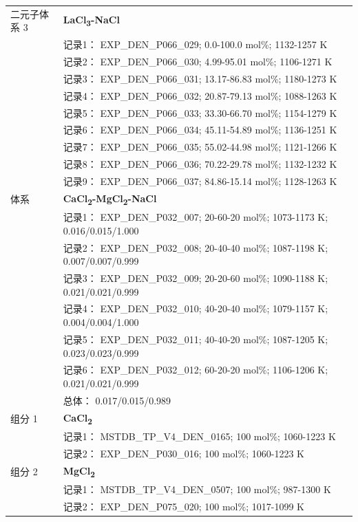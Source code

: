 \documentclass[12pt]{article}
\begin{document}
{\begin{longtable}[]{@{}
  >{\raggedright\arraybackslash}p{}
  >{\raggedright\arraybackslash}p{}@{}}
二元子体系 3  & \textbf{LaCl\textsubscript{3}-NaCl} \\
 & 记录1： EXP\_DEN\_P066\_029; 0.0-100.0 mol\%; 1132-1257 K \\
 & 记录2： EXP\_DEN\_P066\_030; 4.99-95.01 mol\%; 1106-1271 K \\
 & 记录3： EXP\_DEN\_P066\_031; 13.17-86.83 mol\%; 1180-1273 K \\
 & 记录4： EXP\_DEN\_P066\_032; 20.87-79.13 mol\%; 1088-1263 K \\
 & 记录5： EXP\_DEN\_P066\_033; 33.30-66.70 mol\%; 1154-1279 K \\
 & 记录6： EXP\_DEN\_P066\_034; 45.11-54.89 mol\%; 1136-1251 K \\
 & 记录7： EXP\_DEN\_P066\_035; 55.02-44.98 mol\%; 1121-1266 K \\
 & 记录8： EXP\_DEN\_P066\_036; 70.22-29.78 mol\%; 1132-1232 K \\
 & 记录9： EXP\_DEN\_P066\_037; 84.86-15.14 mol\%; 1128-1263 K  \\

\midrule
体系 & \textbf{CaCl\textsubscript{2}-MgCl\textsubscript{2}-NaCl} \\
 & 记录1： EXP\_DEN\_P032\_007; 20-60-20 mol\%; 1073-1173 K; 0.016/0.015/1.000 \\
 & 记录2： EXP\_DEN\_P032\_008; 20-40-40 mol\%; 1087-1198 K; 0.007/0.007/0.999 \\
 & 记录3： EXP\_DEN\_P032\_009; 20-20-60 mol\%; 1090-1188 K; 0.021/0.021/0.999 \\
 & 记录4： EXP\_DEN\_P032\_010; 40-20-40 mol\%; 1079-1157 K; 0.004/0.004/1.000 \\
 & 记录5： EXP\_DEN\_P032\_011; 40-40-20 mol\%; 1087-1205 K; 0.023/0.023/0.999 \\
 & 记录6： EXP\_DEN\_P032\_012; 60-20-20 mol\%; 1106-1206 K; 0.021/0.021/0.999 \\
 & 总体： 0.017/0.015/0.989  \\

组分 1  & \textbf{CaCl\textsubscript{2}} \\
 & 记录1： MSTDB\_TP\_V4\_DEN\_0165; 100 mol\%; 1060-1223 K \\
 & 记录2： EXP\_DEN\_P030\_016; 100 mol\%; 1060-1223 K  \\

组分 2  & \textbf{MgCl\textsubscript{2}} \\
 & 记录1： MSTDB\_TP\_V4\_DEN\_0507; 100 mol\%; 987-1300 K \\
 & 记录2： EXP\_DEN\_P075\_020; 100 mol\%; 1017-1099 K  \\


\end{longtable}}
\end{document}
